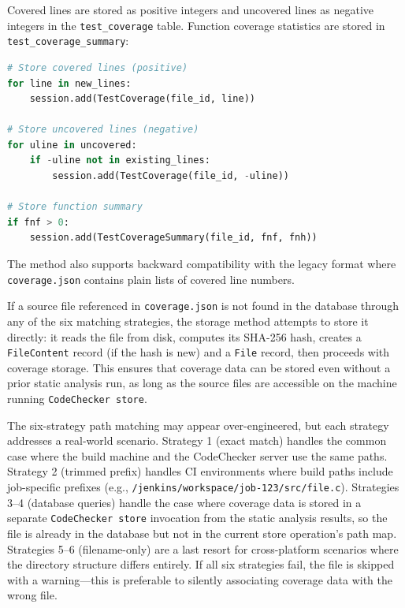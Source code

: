 Covered lines are stored as positive integers and uncovered lines as negative integers in the \texttt{test\_coverage} table. Function coverage statistics are stored in \texttt{test\_coverage\_summary}:

\begin{lstlisting}[language=Python, caption={Storing coverage data with sign encoding}]
# Store covered lines (positive)
for line in new_lines:
    session.add(TestCoverage(file_id, line))

# Store uncovered lines (negative)
for uline in uncovered:
    if -uline not in existing_lines:
        session.add(TestCoverage(file_id, -uline))

# Store function summary
if fnf > 0:
    session.add(TestCoverageSummary(file_id, fnf, fnh))
\end{lstlisting}

The method also supports backward compatibility with the legacy format where \texttt{coverage.json} contains plain lists of covered line numbers.

If a source file referenced in \texttt{coverage.json} is not found in the database through any of the six matching strategies, the storage method attempts to store it directly: it reads the file from disk, computes its SHA-256 hash, creates a \texttt{FileContent} record (if the hash is new) and a \texttt{File} record, then proceeds with coverage storage. This ensures that coverage data can be stored even without a prior static analysis run, as long as the source files are accessible on the machine running \texttt{CodeChecker store}.

The six-strategy path matching may appear over-engineered, but each strategy addresses a real-world scenario. Strategy 1 (exact match) handles the common case where the build machine and the CodeChecker server use the same paths. Strategy 2 (trimmed prefix) handles CI environments where build paths include job-specific prefixes (e.g., \texttt{/jenkins/workspace/job-123/src/file.c}). Strategies 3--4 (database queries) handle the case where coverage data is stored in a separate \texttt{CodeChecker store} invocation from the static analysis results, so the file is already in the database but not in the current store operation's path map. Strategies 5--6 (filename-only) are a last resort for cross-platform scenarios where the directory structure differs entirely. If all six strategies fail, the file is skipped with a warning---this is preferable to silently associating coverage data with the wrong file.

